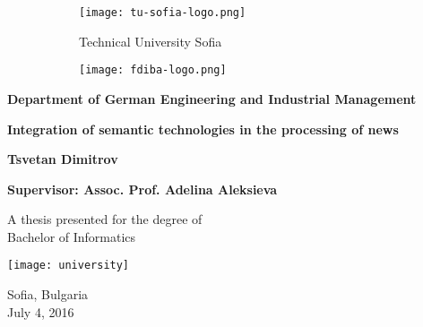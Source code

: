 
    \begin{figure}  
        \begin{subfigure}[b]{0.3\textwidth}
            \texttt{[image: tu-sofia-logo.png]}
        \end{subfigure}
        \begin{subfigure}[b]{0.36\textwidth}
            \centering
            \Large{Technical University Sofia}
        \end{subfigure}
        \begin{subfigure}[b]{0.3\textwidth}
            \texttt{[image: fdiba-logo.png]}
        \end{subfigure}
    \end{figure}
    \begin{center}
        \textbf{\large{Department of German Engineering and Industrial Management}}
        
        \vspace*{4cm}
        
        \textbf{\Huge{Integration of semantic technologies in the processing of news}}
    
        \vspace{1.5cm}

        \textbf{\large{Tsvetan Dimitrov}}
        
        \vspace{1.5cm}
        
        \textbf{\large{Supervisor: Assoc. Prof. Adelina Aleksieva}}

        
        \vfill
        
        A thesis presented for the degree of\\
        Bachelor of Informatics
        
        \vspace{0.8cm}
        
        \texttt{[image: university]}
    
        Sofia, Bulgaria\\
        July 4, 2016
    \end{center}

